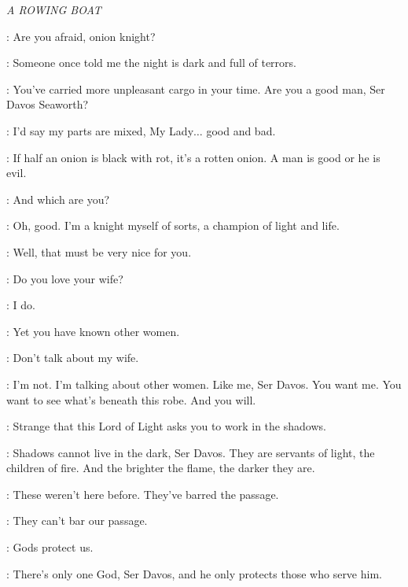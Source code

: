 \scene

\textit{A ROWING BOAT} 


\MELISANDRE: Are you afraid, onion knight? 

\DAVOS: Someone once told me the night is dark and full of terrors. 

\MELISANDRE: You've carried more unpleasant cargo in your time. Are you a good man, Ser Davos Seaworth? 

\DAVOS: I'd say my parts are mixed, My Lady$\ldots$ good and bad. 

\MELISANDRE: If half an onion is black with rot, it's a rotten onion. A man is good or he is evil. 

\DAVOS: And which are you?

\MELISANDRE: Oh, good. I'm a knight myself of sorts, a champion of light and life. 

\DAVOS: Well, that must be very nice for you. 

\MELISANDRE: Do you love your wife? 

\DAVOS: I do. 

\MELISANDRE: Yet you have known other women. 

\DAVOS: Don't talk about my wife. 


\MELISANDRE: I'm not. I'm talking about other women. Like me, Ser Davos. You want me. You want to see what's beneath this robe. And you will. 

\DAVOS: Strange that this Lord of Light asks you to work in the shadows. 


\MELISANDRE: Shadows cannot live in the dark, Ser Davos. They are servants of light, the children of fire. And the brighter the flame, the darker they are. 


\DAVOS: These weren't here before. They've barred the passage. 

\MELISANDRE: They can't bar our passage. 


\DAVOS: Gods protect us. 

\MELISANDRE: There's only one God, Ser Davos, and he only protects those who serve him. 




